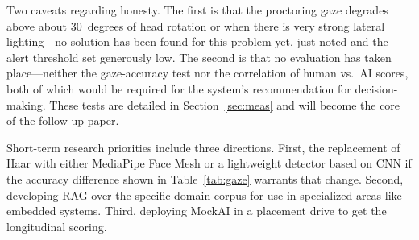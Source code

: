 \documentclass[conference]{IEEEtran}
\begin{document}
Two caveats regarding honesty. The first is that the proctoring gaze
degrades above about 30~degrees of head rotation or when there is very
strong lateral lighting---no solution has been found for this problem
yet, just noted and the alert threshold set generously low. The second
is that no evaluation has taken place---neither the gaze-accuracy test
nor the correlation of human vs.\ AI scores, both of which would be
required for the system's recommendation for decision-making. These
tests are detailed in Section~\ref{sec:meas} and will become the core
of the follow-up paper.

Short-term research priorities include three directions. First, the
replacement of Haar with either MediaPipe Face Mesh or a lightweight
detector based on CNN if the accuracy difference shown in
Table~\ref{tab:gaze} warrants that change. Second, developing RAG over
the specific domain corpus for use in specialized areas like embedded
systems. Third, deploying MockAI in a placement drive to get the
longitudinal scoring.
\end{document}
